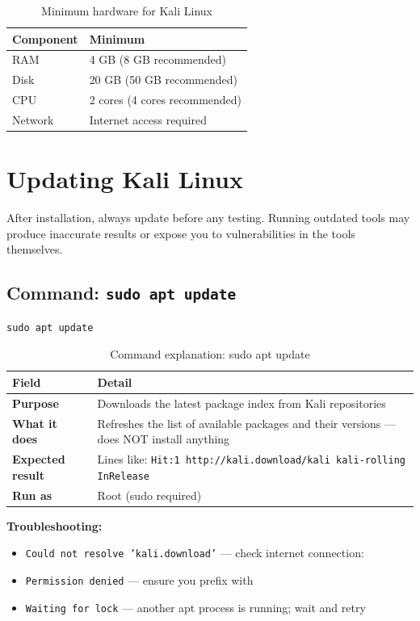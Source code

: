 \begin{table}[H]
\centering
\caption{Minimum hardware for Kali Linux}
\begin{tabular}{ll}
\toprule
Component & Minimum \\
\midrule
RAM & 4 GB (8 GB recommended) \\
Disk & 20 GB (50 GB recommended) \\
CPU & 2 cores (4 cores recommended) \\
Network & Internet access required \\
\bottomrule
\end{tabular}
\end{table}

\section{Updating Kali Linux}

After installation, always update before any testing. Running outdated tools may produce inaccurate results or expose you to vulnerabilities in the tools themselves.

\subsection{Command: \texttt{sudo apt update}}

\begin{lstlisting}[style=terminal, caption={Update the package list}]
sudo apt update
\end{lstlisting}

\begin{table}[H]
\centering
\caption{Command explanation: sudo apt update}
\begin{tabularx}{\textwidth}{>{\bfseries}lX}
\toprule
Field & Detail \\
\midrule
Purpose & Downloads the latest package index from Kali repositories \\
What it does & Refreshes the list of available packages and their versions — does NOT install anything \\
Expected result & Lines like: \texttt{Hit:1 http://kali.download/kali kali-rolling InRelease} \\
Run as & Root (sudo required) \\
\bottomrule
\end{tabularx}
\end{table}

\textbf{Troubleshooting:}
\begin{itemize}
  \item \texttt{Could not resolve 'kali.download'} — check internet connection: 
  \item \texttt{Permission denied} — ensure you prefix with 
  \item \texttt{Waiting for lock} — another apt process is running; wait and retry
\end{itemize}

